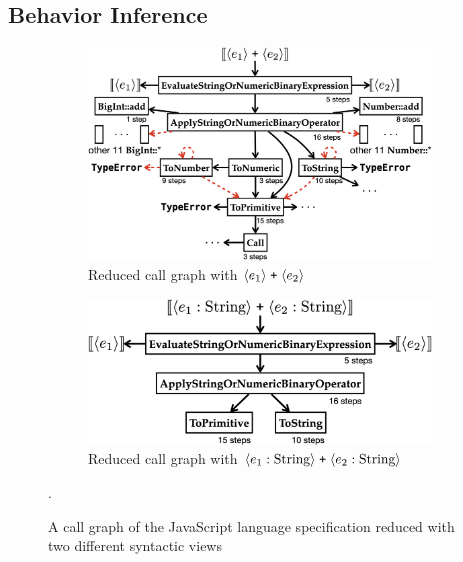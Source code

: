 \subsection{Behavior Inference}\label{sec:reduce-spec}

\begin{figure}
  \centering
  \begin{subfigure}[t]{\columnwidth}
    \centering
    \includegraphics[width=\textwidth]{img/add-basic.png}
    \caption{Reduced call graph with $\langle e_1 \rangle \; \texttt{+} \;
    \langle e_2 \rangle$}
  \end{subfigure}
  \begin{subfigure}[t]{\columnwidth}
    \centering
    \includegraphics[width=.8\textwidth]{img/add-str.png}
    \caption{Reduced call graph with $\langle e_1: \text{String} \rangle \;
    \texttt{+} \; \langle e_2: \text{String} \rangle$}
  \end{subfigure}
  \caption{A call graph of the JavaScript language specification reduced with
    two different syntactic views}
  \vspace*{-1em}
  \label{fig:add-graph}.
\end{figure}

